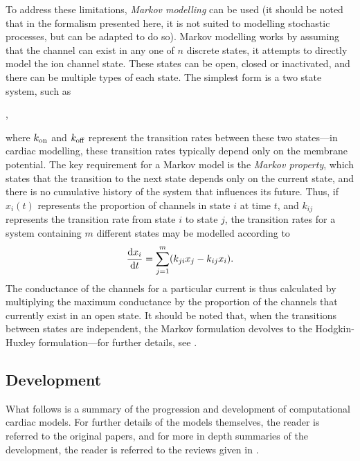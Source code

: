 \documentclass[../thesis-main.tex]{subfiles}
\begin{document}
To address these limitations, \emph{Markov modelling} can be used (it should be noted that in the formalism presented here, it is not suited to modelling stochastic processes, but can be adapted to do so). Markov modelling works by assuming that the channel can exist in any one of $n$ discrete states, \idest{} it attempts to directly model the ion channel state. These states can be open, closed or inactivated, and there can be multiple types of each state. The simplest form is a two state system, such as
\begin{center}
 ,
\end{center}
where $k_\textnormal{on}$ and $k_\textnormal{off}$ represent the transition rates between these two states---in cardiac modelling, these transition rates typically depend only on the membrane potential. The key requirement for a Markov model is the \emph{Markov property}, which states that the transition to the next state depends only on the current state, and there is no cumulative history of the system that influences its future. Thus, if $x_i(t)$ represents the proportion of channels in state $i$ at time $t$, and $k_{ij}$ represents the transition rate from state $i$ to state $j$, the transition rates for a system containing $m$ different states may be modelled according to
\begin{equation}
 \frac{\textnormal{d}x_i}{\textnormal{d}t} = \sum_{j=1}^m (k_{ji}x_j - k_{ij}x_i).
\end{equation}
The conductance of the channels for a particular current is thus calculated by multiplying the maximum conductance by the proportion of the channels that currently exist in an open state. It should be noted that, when the transitions between states are independent, the Markov formulation devolves to the Hodgkin-Huxley formulation---for further details, see \citet{Rudy2006}.

\subsection{Development}
\label{subsec:model-development}
What follows is a summary of the progression and development of computational cardiac models. For further details of the models themselves, the reader is referred to the original papers, and for more in depth summaries of the development, the reader is referred to the reviews given in \citet{Noble2001, Noble2012, Noble2011, Puglisi2004, Rudy2006, Niederer2009}.
\end{document}
